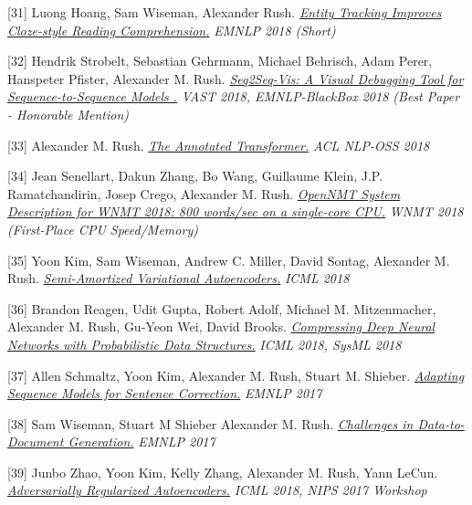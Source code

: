 \documentclass[10pt]{article}
\begin{document}
\medskip


[31] \ind Luong Hoang, Sam Wiseman, Alexander Rush. \emph{\href{ https://www.aclweb.org/anthology/D18-1130 }{ Entity Tracking Improves Cloze-style Reading Comprehension.} }\emph{ EMNLP 2018 (Short) }

\medskip


[32] \ind Hendrik Strobelt, Sebastian Gehrmann, Michael Behrisch, Adam Perer, Hanspeter Pfister, Alexander M. Rush. \emph{\href{ https://arxiv.org/abs/1804.09299 }{ Seq2Seq-Vis: A Visual Debugging Tool for Sequence-to-Sequence Models .} }\emph{ VAST 2018, EMNLP-BlackBox 2018 (Best Paper - Honorable Mention) }

\medskip


[33] \ind Alexander M. Rush. \emph{\href{ http://aclweb.org/anthology/W18-2509 }{ The Annotated Transformer.} }\emph{ ACL NLP-OSS 2018 }

\medskip


[34] \ind Jean Senellart, Dakun Zhang, Bo Wang, Guillaume Klein, J.P. Ramatchandirin, Josep Crego, Alexander M. Rush. \emph{\href{ http://aclweb.org/anthology/W18-2715 }{ OpenNMT System Description for WNMT 2018: 800 words/sec on a single-core CPU.} }\emph{ WNMT 2018  (First-Place CPU Speed/Memory) }

\medskip


[35] \ind Yoon Kim, Sam Wiseman, Andrew C. Miller, David Sontag, Alexander M. Rush. \emph{\href{ https://arxiv.org/abs/1802.02550 }{ Semi-Amortized Variational Autoencoders.} }\emph{ ICML 2018 }

\medskip


[36] \ind Brandon Reagen, Udit Gupta, Robert Adolf, Michael M. Mitzenmacher, Alexander M. Rush, Gu-Yeon Wei, David Brooks. \emph{\href{ https://www.sysml.cc/doc/68.pdf }{ Compressing Deep Neural Networks with Probabilistic Data Structures.} }\emph{ ICML 2018, SysML 2018 }

\medskip


[37] \ind Allen Schmaltz, Yoon Kim, Alexander M. Rush, Stuart M. Shieber. \emph{\href{ https://arxiv.org/abs/1707.09067 }{ Adapting Sequence Models for Sentence Correction.} }\emph{ EMNLP 2017 }

\medskip


[38] \ind Sam Wiseman, Stuart M Shieber Alexander M. Rush. \emph{\href{ https://arxiv.org/abs/1707.08052 }{ Challenges in Data-to-Document Generation.} }\emph{ EMNLP 2017 }

\medskip


[39] \ind Junbo Zhao, Yoon Kim, Kelly Zhang, Alexander M. Rush, Yann LeCun. \emph{\href{ https://arxiv.org/abs/1706.04223 }{ Adversarially Regularized Autoencoders.} }\emph{ ICML 2018, NIPS 2017 Workshop }
\end{document}
